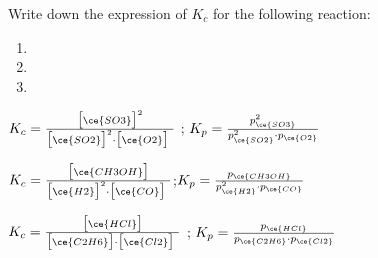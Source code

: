 \documentclass[main.tex]{subfiles}
\begin{document}
\begin{multicols*}{2}
\begin{question}[ID=\the\value{numA}]
Write down the expression of $K_{c}$ for the following reaction:
 \begin{enumerate}[label=(\alph*)]	
\item  {} %
\item  {} %
\item  {} %
 \end{enumerate}
\end{question}
\begin{solution}
\begin{inparaenum}[(a)]
\item    $K_{c}=\frac{   \big[ \ce{SO3} \big]^2    } { \big[\ce{SO2} \big]^2 \cdot \big[\ce{O2} \big]\  } $ ; $K_{p}=\frac{   p_{\ce{SO3}}^2    } { p_{\ce{SO2}}^2 \cdot p_{\ce{O2}}  } $
\item    $K_{c}=\frac{  \big[\ce{CH3OH} \big]  } { \big[\ce{H2} \big]^2 \cdot \big[\ce{CO} \big]\  } $;$K_{p}=\frac{  p_{\ce{CH3OH}}   } { p_{\ce{H2}}^2 \cdot p_{\ce{CO}}  } $
\item  $K_{c}=\frac{   \big[ \ce{HCl} \big]    } { \big[\ce{C2H6} \big] \cdot \big[\ce{Cl2} \big]\  } $ ; $K_{p}=\frac{   p_{ \ce{HCl}}    } { p_{\ce{C2H6}}  \cdot p_{\ce{Cl2}}   } $
 \end{inparaenum}
\hspace{0.1cm}\end{solution}%





\end{multicols*}
\end{document}
